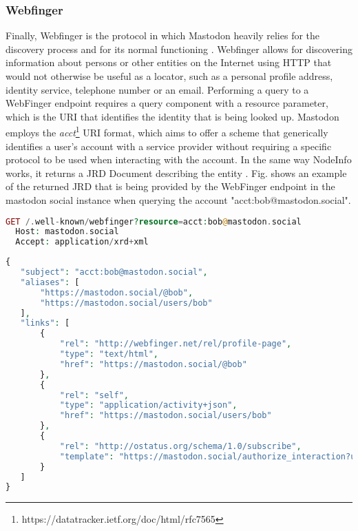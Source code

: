 \subsubsection{Webfinger}
Finally, Webfinger is the protocol in which Mastodon heavily relies for the discovery process and for its normal functioning \cite{rochko_2020}. Webfinger allows for discovering information about persons or other entities on the Internet using HTTP that would not otherwise be useful as a locator, such as a personal profile address, identity service, telephone number or an email. Performing a query to a WebFinger endpoint requires a query component with a resource parameter, which is the URI that identifies the identity that is being looked up. Mastodon employs the \emph{acct}\footnote{https://datatracker.ietf.org/doc/html/rfc7565} URI format, which aims to offer a scheme that generically identifies a user's account with a service provider without requiring a specific protocol to be used when interacting with the account. In the same way NodeInfo works, it returns a JRD Document describing the entity \cite{jones_salgueiro_jones_smarr_2013}.  Fig. \label{Webfinger response from mastodon.social} shows an example of the returned JRD that is being provided by the WebFinger endpoint in the mastodon social instance when querying the account "acct:bob@mastodon.social".

\lstset{style=JSONStyle}
\begin{lstlisting}[language=PHP, caption=HTTP request to Webfinger endpoint, label=Webfinger request]
  GET /.well-known/webfinger?resource=acct:bob@mastodon.social
  Host: mastodon.social
  Accept: application/xrd+xml
\end{lstlisting}

\begin{lstlisting}[language=PHP, caption=Webfinger response, label=Webfinger response from mastodon.social]
{
   "subject": "acct:bob@mastodon.social",
   "aliases": [
       "https://mastodon.social/@bob",
       "https://mastodon.social/users/bob"
   ],
   "links": [
       {
           "rel": "http://webfinger.net/rel/profile-page",
           "type": "text/html",
           "href": "https://mastodon.social/@bob"
       },
       {
           "rel": "self",
           "type": "application/activity+json",
           "href": "https://mastodon.social/users/bob"
       },
       {
           "rel": "http://ostatus.org/schema/1.0/subscribe",
           "template": "https://mastodon.social/authorize_interaction?uri={uri}"
       }
   ]
}
\end{lstlisting}

